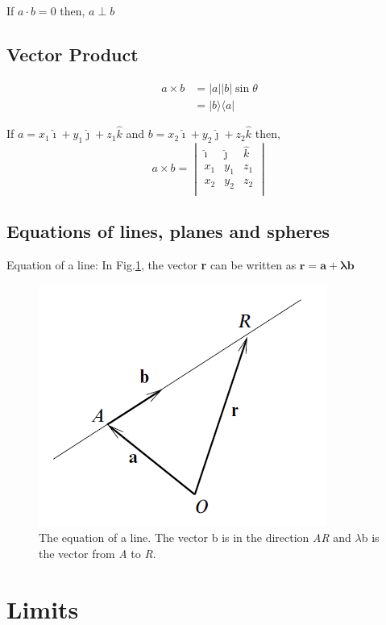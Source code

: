 \documentclass[12pt]{article}
\begin{document}
If $a \cdot b = 0$ then, $ a \perp b$

\subsection{Vector Product}
\begin{align*}
a\times b &= \lvert a \rvert \lvert b \rvert \sin\theta \\
&=|b\rangle \langle a|
\end{align*}

If $a = x_1 \hat{\imath} + y_1 \hat{\jmath} + z_1 \hat{k}$ and $b = x_2 \hat{\imath} + y_2 \hat{\jmath} + z_2 \hat{k}$ then,
$$
a \times b =  
\begin{vmatrix}
\hat{\imath} & \hat{\jmath} & \hat{k} \\
x_1 & y_1 & z_1 \\
x_2 & y_2 & z_2 \\
\end{vmatrix}
$$

\subsection{Equations of lines, planes and spheres}

Equation of a line:
In Fig.\ref{eqnline}, the vector {\bfseries r} can be written as $\mathbf{r} = \mathbf{a + \lambda b}$
\begin{figure}[h]
	\centering
	\includegraphics[scale=0.75]{line}
	\caption{\label{eqnline} The equation of a line. The vector b is in the direction \emph{AR} and $\mathcal{\lambda}$b is the vector from \emph{A} to \emph{R}.}
\end{figure}

\section{Limits}
\end{document}
